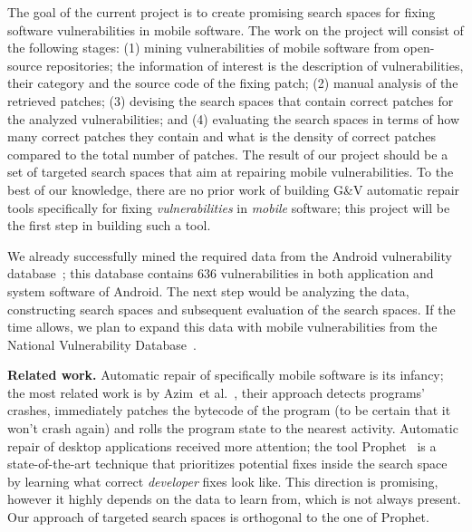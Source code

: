 \documentclass[letterpaper, 11pt]{article}
\begin{document}
The goal of the current project is to create promising search spaces for fixing software vulnerabilities in mobile software. The work on the project will consist of the following stages: (1) mining vulnerabilities of mobile software from open-source repositories; the information of interest is the description of vulnerabilities, their category and the source code of the fixing patch; (2) manual analysis of the retrieved patches; (3) devising the search spaces that contain correct patches for the analyzed vulnerabilities; and (4) evaluating the search spaces in terms of how many correct patches they contain and what is the density of correct patches compared to the total number of patches. The result of our project should be a set of targeted search spaces that aim at repairing mobile vulnerabilities. To the best of our knowledge, there are no prior work of building G\&V automatic repair tools specifically for fixing \emph{vulnerabilities} in \emph{mobile} software; this project will be the first step in building such a tool.

We already successfully mined the required data from the Android vulnerability database~\cite{android-vulns}; this database contains 636 vulnerabilities in both application and system software of Android. The next step would be analyzing the data, constructing search spaces and subsequent evaluation of the search spaces. If the time allows, we plan to expand this data with mobile vulnerabilities from the National Vulnerability Database~\cite{nvd}.

\textbf{Related work.} Automatic repair of specifically mobile software is its infancy; the most related work is by Azim~et al.~\cite{azim2014towards}, their approach detects programs' crashes, immediately patches the bytecode of the program (to be certain that it won't crash again) and rolls the program state to the nearest activity. Automatic repair of desktop applications received more attention; the tool Prophet~\cite{long2015prophet} is a state-of-the-art technique that prioritizes potential fixes inside the search space by learning what correct \emph{developer} fixes look like. This direction is promising, however it highly depends on the data to learn from, which is not always present. Our approach of targeted search spaces is orthogonal to the one of Prophet.



\end{document}
